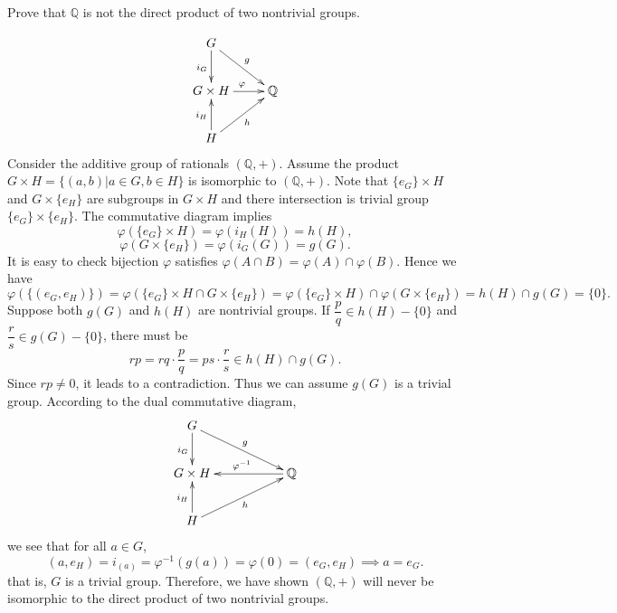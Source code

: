 \documentclass[12pt,letterpaper,boxed]{hmcpset}
\begin{document}
\begin{problem}[3.3]	
	Prove that $\mathbb{Q}$ is not the direct product of two nontrivial groups.
\end{problem}
\begin{solution}
	\[\xymatrix{
		G\ar[rd]^{g}\ar[d]_{i_G}  \\
		G \times H\ar[r]^{\varphi} &  \mathbb{Q}\\
		H\ar[ru]_{h}\ar[u]^{i_H}  
	}\]
    Consider the additive group of rationals $(\mathbb{Q},+)$. Assume the product $G\times H=\{(a,b)|a\in G,b\in H\}$ is isomorphic to $(\mathbb{Q},+)$. Note that $\{e_G\}\times H$ and $G\times \{e_H\}$ are subgroups in $G\times H$ and there intersection is trivial group $\{e_G\}\times \{e_H\}$. The commutative diagram implies 
    \[
    \varphi(\{e_G\}\times H)=\varphi(i_H(H))=h(H),
    \]
    \[
    \varphi(G\times \{e_H\})=\varphi(i_G(G))=g(G).
    \]
    It is easy to check bijection $\varphi$ satisfies $\varphi(A\cap B)=\varphi(A)\cap\varphi (B)$. Hence we have
    \[
    \varphi(\{(e_G,e_H)\})=\varphi(\{e_G\}\times H\cap G\times \{e_H\})=\varphi(\{e_G\}\times H)\cap \varphi(G\times \{e_H\})=h(H)\cap g(G)=\{0\}.
    \] 
    Suppose both $g(G)$ and $h(H)$ are nontrivial groups. If $\dfrac{p}{q}\in h(H)-\{0\}$ and $\dfrac{r}{s}\in g(G)-\{0\}$, there must be 
    \[
    rp=rq\cdot\dfrac{p}{q}=ps\cdot\dfrac{r}{s}\in h(H)\cap g(G). 
    \]
    Since $rp\ne0$, it leads to a contradiction. Thus we can assume $g(G)$ is a trivial group. According to the dual commutative diagram,
    \[\xymatrix{
    	G\ar[rrd]^{g}\ar[d]_{i_G}  \\
    	G \times H &  &\mathbb{Q}\ar[ll]_{\varphi^{-1}}\\
    	H\ar[rru]_{h}\ar[u]^{i_H}  
    }\]
    we see that for all $a\in G$,
    \[
    (a,e_H)=i_(a)=\varphi^{-1}(g(a))=\varphi(0)=(e_G,e_H)\implies a=e_G.
    \]
    that is, $G$ is a trivial group. Therefore, we have shown $(\mathbb{Q},+)$ will never be isomorphic to the direct product of two nontrivial groups.
\end{solution}

~\\
\end{document}
